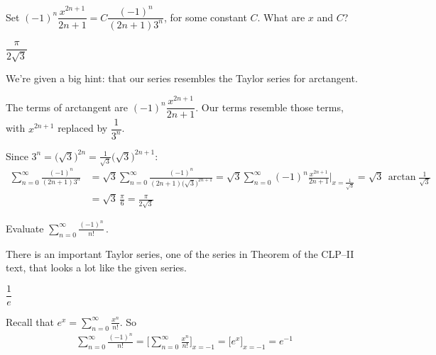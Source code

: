 \begin{hint}
Set $(-1)^n\dfrac{x^{2n+1}}{2n+1}=C\dfrac{(-1)^n}{(2n+1)3^n}$, for some constant $C$. What are $x$ and $C$?
\end{hint}

\begin{answer}
$\dfrac{\pi}{2\sqrt{3}}$
\end{answer}

\begin{solution}
	We're given a big hint: that our series resembles the Taylor series for arctangent.

	The terms of arctangent are $(-1)^n\dfrac{x^{2n+1}}{2n+1}$. Our terms resemble those terms, with $x^{2n+1}$ replaced by $\dfrac{1}{3^n}$.

Since  $3^n=\big(\sqrt{3}\big)^{2n}=\frac{1}{\sqrt{3}}\big(\sqrt{3}\big)^{2n+1}$:
\begin{align*}
\sum_{n=0}^\infty \frac{(-1)^n}{(2n+1) 3^n}
&=\sqrt{3} \sum_{n=0}^\infty \frac{(-1)^n}{(2n+1)\big(\sqrt{3}\big)^{2n+1} }
=\sqrt{3} \sum_{n=0}^\infty (-1)^n\frac{x^{2n+1}}{2n+1}
         \bigg|_{x=\frac{1}{\sqrt{3}}}
=\sqrt{3}\,\arctan\frac{1}{\sqrt{3}} \\
&=\sqrt{3}\,\frac{\pi}{6}
=\frac{\pi}{2\sqrt{3}}
\end{align*}
\end{solution}


\begin{question}[2014D]
Evaluate ${\displaystyle\sum_{n=0}^\infty\frac{(-1)^n}{n!}}\,$.
\end{question}

\begin{hint}
There is an important Taylor series, one of the series in
Theorem  of the
CLP--II text, that looks a lot like the given series.
\end{hint}

\begin{answer}
$\dfrac{1}{e}$
\end{answer}

\begin{solution}
Recall that $e^x =\displaystyle \sum\limits_{n=0}^\infty\frac{x^n}{n!}$. So
\begin{align*}
\sum_{n=0}^\infty\frac{(-1)^n}{n!}
=\Big[\sum_{n=0}^\infty\frac{x^n}{n!}\Big]_{x=-1}
=\Big[e^x\Big]_{x=-1}
=e^{-1}
\end{align*}
\end{solution}


